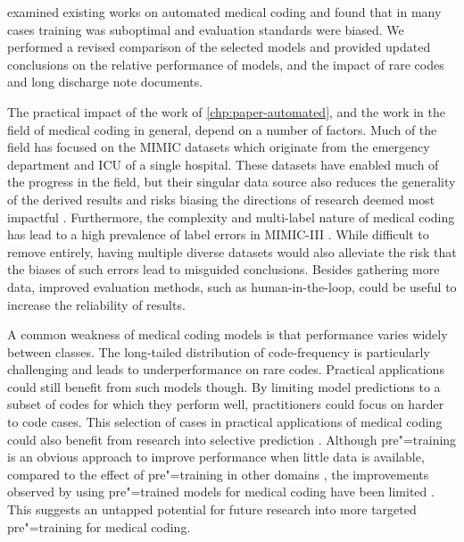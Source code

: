 \vspace{1em}
\textbf{} examined existing works on automated medical coding and found that in many cases training was suboptimal and evaluation standards were biased. We performed a revised comparison of the selected models and provided updated conclusions on the relative performance of models, and the impact of rare codes and long discharge note documents. 

The practical impact of the work of \cref{chp:paper-automated}, and the work in the field of medical coding in general, depend on a number of factors. 
Much of the field has focused on the MIMIC datasets which originate from the emergency department and ICU of a single hospital. These datasets have enabled much of the progress in the field, but their singular data source also reduces the generality of the derived results and risks biasing the directions of research deemed most impactful \parencite{tengReviewDeepNeural2022, venkateshAutomatingOverburdenedClinical2023,johnsonMIMICIIIFreelyAccessible2016,johnsonMIMICIVFreelyAccessible2023}. 
Furthermore, the complexity and multi-label nature of medical coding has lead to a high prevalence of label errors in MIMIC-III \parencite{searleExperimentalEvaluationDevelopment2020}. While difficult to remove entirely, having multiple diverse datasets would also alleviate the risk that the biases of such errors lead to misguided conclusions. Besides gathering more data, improved evaluation methods, such as human-in-the-loop, could be useful to increase the reliability of results. 

A common weakness of medical coding models is that performance varies widely between classes. The long-tailed distribution of code-frequency is particularly challenging and leads to underperformance on rare codes. Practical applications could still benefit from such models though. By limiting model predictions to a subset of codes for which they perform well, practitioners could focus on harder to code cases. This selection of cases in practical applications of medical coding could also benefit from research into selective prediction \parencite{geifman_selective_2017}. 
Although pre"=training is an obvious approach to improve performance when little data is available, compared to the effect of pre"=training in other domains \parencite{mohamed_selfsupervised_2022, linPretrainedTransformersText2021,baevski_wav2vec_2020,devlin_bert_2018,dosovitskiy_image_2021}, the improvements observed by using pre"=trained models for medical coding have been limited \parencite{jiDoesMagicBERT2021,gaoLimitationsTransformersClinical2021,michalopoulosICDBigBirdContextualEmbedding2022,pascualBERTbasedAutomaticICD2021,zhangBERTXMLLargeScale2020}. This suggests an untapped potential for future research into more targeted pre"=training for medical coding. 

